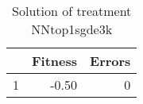 \begin{table}[ht]
\centering
\begin{tabular}{rrr}
  \hline
 & Fitness & Errors \\ 
  \hline
1 & -0.50 &   0 \\ 
   \hline
\end{tabular}
\caption{Solution of treatment NNtop1sgde3k} 
\end{table}
